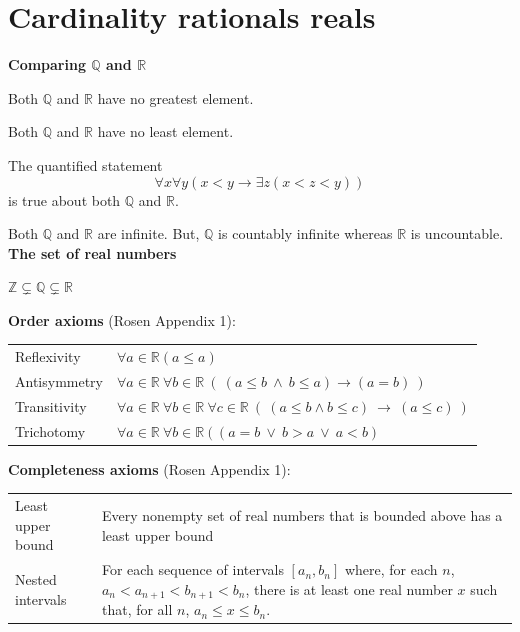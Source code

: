 \documentclass[12pt, oneside]{article}
\begin{document}
\section*{Cardinality rationals reals}


{\bf Comparing $\mathbb{Q}$ and $\mathbb{R}$} 


Both $\mathbb{Q}$ and $\mathbb{R}$ have no greatest element.

Both $\mathbb{Q}$ and $\mathbb{R}$ have no least element.

The quantified statement 
\[
    \forall x \forall y (x < y \to \exists z ( x < z < y) )
\]
is true about both $\mathbb{Q}$ and $\mathbb{R}$.

Both $\mathbb{Q}$ and $\mathbb{R}$ are infinite. But, $\mathbb{Q}$ is countably infinite
whereas $\mathbb{R}$ is uncountable.\\


{\bf The set of real numbers}

$\mathbb{Z} \subsetneq \mathbb{Q} \subsetneq \mathbb{R}$


{\bf  Order axioms} (Rosen Appendix 1): 

\begin{center}
\begin{tabular}{p{1.2in}p{4in}}
Reflexivity &  $\forall a \in  \mathbb{R} (a \leq a)$\\
Antisymmetry &  $\forall a \in  \mathbb{R}~\forall b \in \mathbb{R}~(~(a \leq b~ \wedge ~b \leq a) \to (a=b)~)$\\
Transitivity &  $\forall a \in  \mathbb{R}~\forall b \in \mathbb{R}~\forall c \in \mathbb{R}~
(~(a \leq b \wedge b \leq c) ~\to  ~(a \leq c)~)$ \\
Trichotomy & 
$\forall a \in \mathbb{R}~\forall b \in \mathbb{R}~ ( ~(a=b ~\vee~ b > a ~\vee~ a  < b)  $
\end{tabular}
\end{center}


{\bf  Completeness axioms} (Rosen Appendix 1): 


\begin{center}
\begin{tabular}{p{1.4in}p{6in}}
Least upper bound &  Every nonempty set of real numbers that 
is bounded  above has  a  least upper bound  
\\
Nested intervals &  For each sequence  of intervals  $[a_n , b_n]$
where, for each $n$, $a_n < a_{n+1} < b_{n+1} < b_n$, there
is at least one  real number $x$ such that, for all $n$, 
$a_n \leq x \leq b_n$.\\
\end{tabular}
\end{center}
\end{document}
